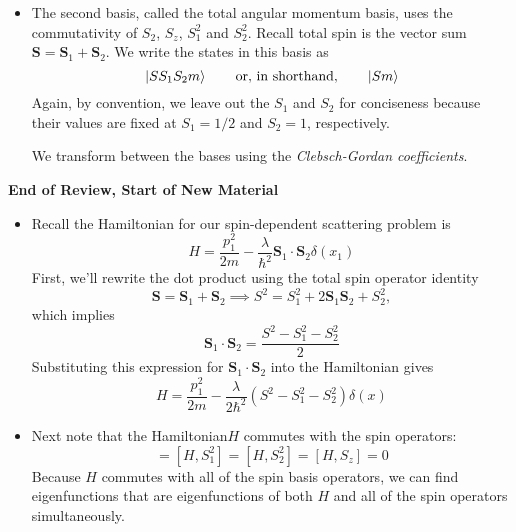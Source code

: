 \documentclass[11pt, a4paper]{article}
\newcommand{\eqtext}[1]{\qquad \text{#1} \qquad}
\newcommand{\Ham}{Hamiltonian\xspace}
\renewcommand{\vec}[1]{\bm{#1}} %
\begin{document}
\begin{itemize}
	\item The second basis, called the total angular momentum basis, uses the commutativity of $ S_{2} $, $ S_{z} $, $ S_{1}^{2} $ and $ S_{2}^{2} $. Recall total spin is the vector sum $ \vec{S} = \vec{S}_{1} + \vec{S}_{2} $.  We write the states in this basis as
	\begin{equation*}
		\ket{SS_{1}S_{2}m} \eqtext{or, in shorthand,} \ket{Sm}
	\end{equation*}
	Again, by convention, we leave out the $ S_{1} $ and $ S_{2} $ for conciseness because their values are fixed at $ S_{1} = 1/2 $ and $ S_{2} = 1 $, respectively.
	
	We transform between the bases using the \textit{Clebsch-Gordan coefficients}.
\end{itemize}
\textbf{End of Review, Start of New Material}
\begin{itemize}
	\item Recall the Hamiltonian for our spin-dependent scattering problem is
	\begin{equation*}
		H = \frac{p_{1}^{2}}{2m} - \frac{\lambda}{\hbar^{2}}\vec{S}_{1} \cdot \vec{S}_{2}\delta (x_{1})
	\end{equation*}
	First, we'll rewrite the dot product using the total spin operator identity
	\begin{equation*}
		\vec{S} = \vec{S}_{1} + \vec{S}_{2} \implies S^{2} = S_{1}^{2} + 2\vec{S}_{1}\vec{S}_{2} + S_{2}^{2},
	\end{equation*}
	which implies 
	\begin{equation*}
		\vec{S}_{1}\cdot \vec{S}_{2} = \frac{S^{2} -S_{1}^{2} - S_{2}^{2}}{2}
	\end{equation*}
	Substituting this expression for $ \vec{S}_{1}\cdot \vec{S}_{2} $ into the Hamiltonian gives
	\begin{equation*}
		H = \frac{p_{1}^{2}}{2m} -  \frac{\lambda}{2\hbar^{2}}(S^{2} -S_{1}^{2} - S_{2}^{2})\delta(x)
	\end{equation*}
	
	\item Next note that the \Ham $ H $ commutes with the spin operators:
	\begin{equation*}
		[H, S^{2}] = [H, S_{1}^{2}] = [H, S_{2}^{2}] = [H, S_{z}] = 0
	\end{equation*}
	Because $ H $ commutes with all of the spin basis operators, we can find eigenfunctions that are eigenfunctions of both $ H $ and all of the spin operators simultaneously.
	

\end{itemize}
\end{document}
